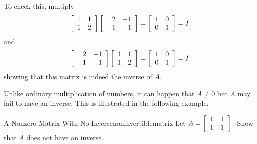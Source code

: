 \begin{solution} To check this, multiply
\begin{equation*}
\left[
\begin{array}{rr}
1 & 1 \\
1 & 2
\end{array}
\right] \left[
\begin{array}{rr}
2 & -1 \\
-1 & 1
\end{array}
\right] =\allowbreak \left[
\begin{array}{rr}
1 & 0 \\
0 & 1
\end{array}
\right] = I 
\end{equation*}
and
\begin{equation*}
\left[
\begin{array}{rr}
2 & -1 \\
-1 & 1
\end{array}
\right] \left[
\begin{array}{rr}
1 & 1 \\
1 & 2
\end{array}
\right] =\allowbreak \left[
\begin{array}{rr}
1 & 0 \\
0 & 1
\end{array}
\right] = I 
\end{equation*}
showing that this matrix is indeed the inverse of $A.$
\end{solution}

Unlike ordinary multiplication of numbers, it can happen that $A\neq 0$ but 
$A$ may fail to have an inverse. This is illustrated in the following example.

\begin{example}{A Nonzero Matrix With No Inverse}{noninvertiblematrix}
Let $A=\left[
\begin{array}{rr}
1 & 1 \\
1 & 1
\end{array}
\right] .$ Show that $A$ does not have an inverse.
\end{example}

